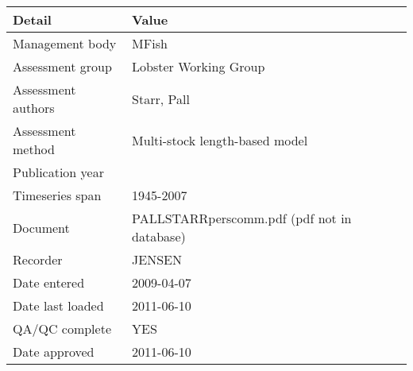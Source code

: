 \begin{table}[htb]
\centering
\begin{tabular}{ll}
\toprule
Detail & Value \\
\midrule
Management body    & MFish                                       \\
Assessment group   & Lobster Working Group                       \\
Assessment authors & Starr, Pall                                 \\
Assessment method  & Multi-stock length-based model              \\
Publication year   &                                             \\
Timeseries span    & 1945-2007                                   \\
Document           & PALLSTARRperscomm.pdf (pdf not in database) \\
Recorder           & JENSEN                                      \\
Date entered       & 2009-04-07                                  \\
Date last loaded   & 2011-06-10                                  \\
QA/QC complete     & YES                                         \\
Date approved      & 2011-06-10                                  \\
\bottomrule
\end{tabular}
\label{tab:assessdet}
\end{table}
